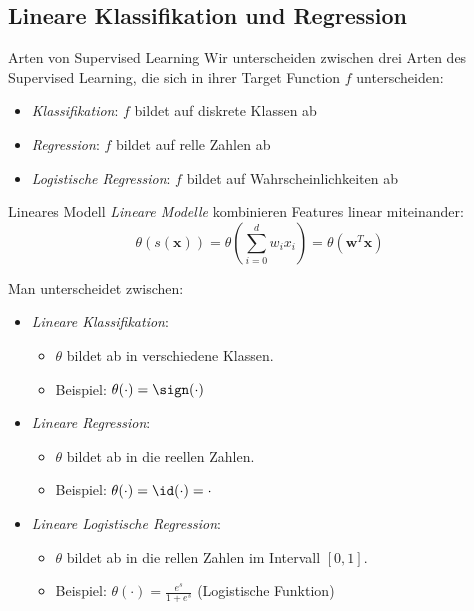 \subsection{Lineare Klassifikation und Regression}

\begin{defi}{Arten von Supervised Learning}
    Wir unterscheiden zwischen drei Arten des Supervised Learning, die sich in ihrer Target Function $f$ unterscheiden:
    \begin{itemize}
        \item \emph{Klassifikation}: $f$ bildet auf diskrete Klassen ab
        \item \emph{Regression}: $f$ bildet auf relle Zahlen ab
        \item \emph{Logistische Regression}: $f$ bildet auf Wahrscheinlichkeiten ab
    \end{itemize}
\end{defi}

\begin{defi}{Lineares Modell}
    \emph{Lineare Modelle} kombinieren Features linear miteinander:
    \[
        \theta (s(\mathbf{x})) = \theta \left( \sum_{i=0}^d w_i x_i \right) = \theta (\mathbf{w}^T \mathbf{x})
    \]

    Man unterscheidet zwischen:
    \begin{itemize}
        \item \emph{Lineare Klassifikation}:
              \begin{itemize}
                  \item $\theta$ bildet ab in verschiedene Klassen.
                  \item Beispiel: $\theta(\cdot) = \sign(\cdot)$
              \end{itemize}
        \item \emph{Lineare Regression}:
              \begin{itemize}
                  \item $\theta$ bildet ab in die reellen Zahlen.
                  \item Beispiel: $\theta(\cdot) = \id(\cdot) = \cdot$
              \end{itemize}
        \item \emph{Lineare Logistische Regression}:
              \begin{itemize}
                  \item $\theta$ bildet ab in die rellen Zahlen im Intervall $[0,1]$.
                  \item Beispiel: $\theta(\cdot) = \frac{e^s}{1+e^s}$ (Logistische Funktion)
              \end{itemize}
    \end{itemize}
\end{defi}

